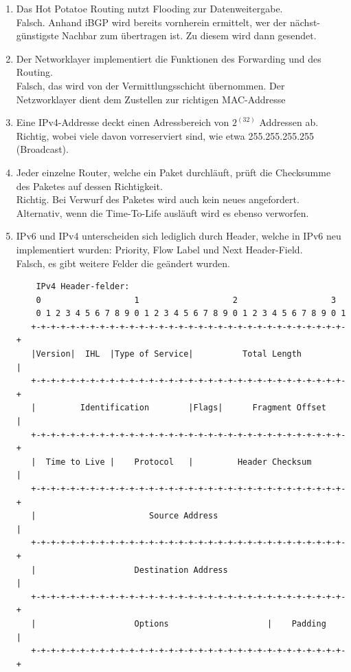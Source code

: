 \documentclass{scrartcl}
\begin{document}
\begin{enumerate}
        \item Das Hot Potatoe Routing nutzt Flooding zur Datenweitergabe.\\
        Falsch. Anhand iBGP wird bereits vornherein ermittelt, wer der nächst-günstigste Nachbar zum übertragen ist. Zu diesem wird dann gesendet.
        
        \item Der Networklayer implementiert die Funktionen des Forwarding und des Routing.\\
        Falsch, das wird von der Vermittlungsschicht übernommen. Der Netzworklayer dient dem Zustellen zur richtigen MAC-Addresse
        
        
        \item Eine IPv4-Addresse deckt einen Adressbereich von $2^(32)$ Addressen ab.\\
        Richtig, wobei viele davon vorreserviert sind, wie etwa 255.255.255.255 (Broadcast). 
        
        \item Jeder einzelne Router, welche ein Paket durchläuft, prüft die Checksumme des Paketes auf dessen Richtigkeit.\\
        Richtig. Bei Verwurf des Paketes wird auch kein neues angefordert.
        Alternativ, wenn die Time-To-Life ausläuft wird es ebenso verworfen.
        
        \item IPv6 und IPv4 unterscheiden sich lediglich durch Header, welche in IPv6 neu implementiert wurden: Priority, Flow Label und Next Header-Field.\\
        Falsch, es gibt weitere Felder die geändert wurden.
        
        \begin{verbatim}
    IPv4 Header-felder:
    0                   1                   2                   3
    0 1 2 3 4 5 6 7 8 9 0 1 2 3 4 5 6 7 8 9 0 1 2 3 4 5 6 7 8 9 0 1
   +-+-+-+-+-+-+-+-+-+-+-+-+-+-+-+-+-+-+-+-+-+-+-+-+-+-+-+-+-+-+-+-+
   |Version|  IHL  |Type of Service|          Total Length         |
   +-+-+-+-+-+-+-+-+-+-+-+-+-+-+-+-+-+-+-+-+-+-+-+-+-+-+-+-+-+-+-+-+
   |         Identification        |Flags|      Fragment Offset    |
   +-+-+-+-+-+-+-+-+-+-+-+-+-+-+-+-+-+-+-+-+-+-+-+-+-+-+-+-+-+-+-+-+
   |  Time to Live |    Protocol   |         Header Checksum       |
   +-+-+-+-+-+-+-+-+-+-+-+-+-+-+-+-+-+-+-+-+-+-+-+-+-+-+-+-+-+-+-+-+
   |                       Source Address                          |
   +-+-+-+-+-+-+-+-+-+-+-+-+-+-+-+-+-+-+-+-+-+-+-+-+-+-+-+-+-+-+-+-+
   |                    Destination Address                        |
   +-+-+-+-+-+-+-+-+-+-+-+-+-+-+-+-+-+-+-+-+-+-+-+-+-+-+-+-+-+-+-+-+
   |                    Options                    |    Padding    |
   +-+-+-+-+-+-+-+-+-+-+-+-+-+-+-+-+-+-+-+-+-+-+-+-+-+-+-+-+-+-+-+-+
        \end{verbatim}
        

\end{enumerate}
\end{document}
